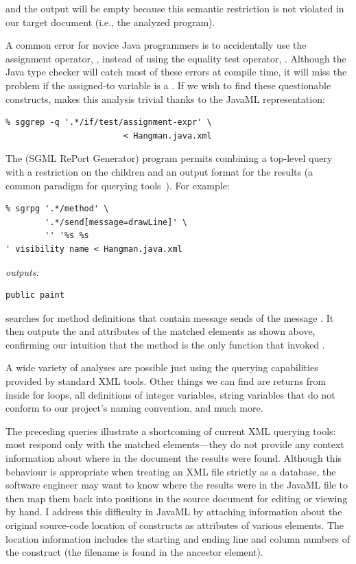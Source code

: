 \documentclass{article}
\begin{document}
\begin{multicols}{2}
\noindent and the output will be empty because this semantic restriction is not
violated in our target document (i.e., the analyzed program).

A common error for novice Java programmers is to accidentally use the
assignment operator, \smtexttt{=}, instead of using the equality test
operator, \smtexttt{==}.  Although the Java type checker will catch
most of these errors at compile time, it will miss the problem if
the assigned-to variable is a . If we wish to find these
questionable constructs,  makes this analysis
trivial thanks to the JavaML representation:

{\small
\begin{verbatim}
% sggrep -q '.*/if/test/assignment-expr' \
                        < Hangman.java.xml
\end{verbatim}
}

The  (SGML RePort Generator) program permits combining a
top-level query with a restriction on the children and an output format
for the results (a common paradigm for querying tools~\cite{XMLQL-EnE}).
For example:

{\small
\begin{verbatim}
% sgrpg '.*/method' \
        '.*/send[message=drawLine]' \
        '' '%s %s 
' visibility name < Hangman.java.xml
\end{verbatim}

\noindent\emph{outputs:}
\begin{verbatim}
public paint
\end{verbatim}
}

\noindent searches for method definitions that contain message sends of the
message \smtexttt{drawLine}.  It then outputs the
 and  attributes of the matched
elements as shown above, confirming our intuition that the
 method is the only function that invoked .

A wide variety of analyses are possible just using the querying
capabilities provided by standard XML tools.  Other things we can find
are returns from inside for loops, all definitions of integer variables,
string variables that do not conform to our project's naming convention,
and much more.

The preceding queries illustrate a shortcoming of current XML querying
tools: most respond only with the matched elements---they do not provide
any context information about where in the document the results were
found.  Although this behaviour is appropriate when treating an XML file
strictly as a database, the software engineer may want to know where the
results were in the JavaML file to then map them back into positions in
the source document for editing or viewing by hand.  I address this
difficulty in JavaML by attaching information about the original
source-code location of constructs as attributes of various elements.
The location information includes the starting and ending line and
column numbers of the construct (the filename is found in the ancestor
\smtexttt{java-class-file} element).


\end{multicols}
\end{document}
